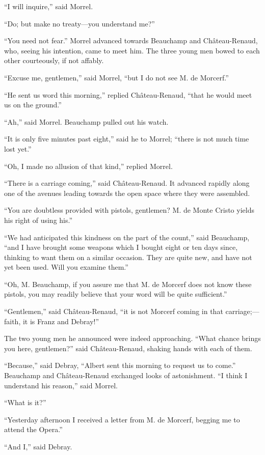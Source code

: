 “I will inquire,” said Morrel.

“Do; but make no treaty—you understand me?”

“You need not fear.” Morrel advanced towards Beauchamp and
Château-Renaud, who, seeing his intention, came to meet him. The three
young men bowed to each other courteously, if not affably.

“Excuse me, gentlemen,” said Morrel, “but I do not see M. de Morcerf.”

“He sent us word this morning,” replied Château-Renaud, “that he would
meet us on the ground.”

“Ah,” said Morrel. Beauchamp pulled out his watch.

“It is only five minutes past eight,” said he to Morrel; “there is not
much time lost yet.”

“Oh, I made no allusion of that kind,” replied Morrel.

“There is a carriage coming,” said Château-Renaud. It advanced rapidly
along one of the avenues leading towards the open space where they were
assembled.

“You are doubtless provided with pistols, gentlemen? M. de Monte Cristo
yields his right of using his.”

“We had anticipated this kindness on the part of the count,” said
Beauchamp, “and I have brought some weapons which I bought eight or ten
days since, thinking to want them on a similar occasion. They are quite
new, and have not yet been used. Will you examine them.”

“Oh, M. Beauchamp, if you assure me that M. de Morcerf does not know
these pistols, you may readily believe that your word will be quite
sufficient.”

“Gentlemen,” said Château-Renaud, “it is not Morcerf coming in that
carriage;—faith, it is Franz and Debray!”

The two young men he announced were indeed approaching. “What chance
brings you here, gentlemen?” said Château-Renaud, shaking hands with
each of them.

“Because,” said Debray, “Albert sent this morning to request us to
come.” Beauchamp and Château-Renaud exchanged looks of astonishment. “I
think I understand his reason,” said Morrel.

“What is it?”

“Yesterday afternoon I received a letter from M. de Morcerf, begging me
to attend the Opera.”

“And I,” said Debray.

